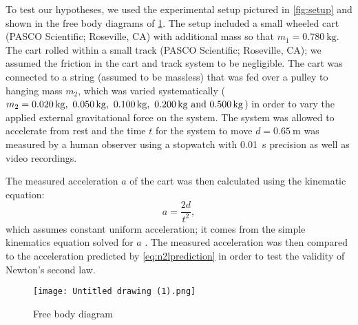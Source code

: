 ﻿\documentclass[reprint,amsmath,amssymb,aps]{revtex4-2}
\begin{document}
To test our hypotheses, we used the experimental setup pictured in \cref{fig:setup} and shown in the free body diagrams of \cref{fig:freebody}.  The setup included a small wheeled cart (PASCO Scientific; Roseville, CA) with additional mass so that $m_1=\qty{0.780}{\kilo\gram}$. The cart rolled within a small track (PASCO Scientific; Roseville, CA); we assumed the friction in the cart and track system to be negligible. The cart was connected to a string (assumed to be massless) that was fed over a pulley to hanging mass $m_2$, which was varied systematically ($m_2=\qtylist{0.020;0.050;0.100;0.200;0.500}{\kilo\gram}$)  in order to vary the applied external gravitational force on the system. The system was allowed to accelerate from rest and the time $t$ for the system to move $d=\qty{0.65}{\meter}$ was measured by a human observer using a stopwatch with \qty{0.01}{\second} precision as well as video recordings. 

The measured acceleration $a$ of the cart was then calculated using the kinematic equation:
\begin{equation}
a = \frac{2d}{t^2},
\label{eq:ameas}
\end{equation}
which assumes constant uniform acceleration; it comes from the simple kinematics equation solved for $a$ \cite{tipler}.  The measured acceleration was then compared to the acceleration predicted by \cref{eq:n2lprediction} in order to test the validity of Newton's second law. 



\begin{figure}
\begin{center}
\texttt{[image: Untitled drawing (1).png]}
\end{center}
\caption{\label{fig:freebody} Free body diagram}
\end{figure}
\end{document}
